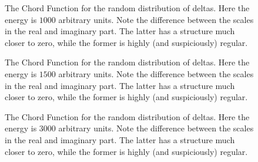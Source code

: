 \documentclass[a4paper,10pt]{article}
\begin{document}
\begin{figure}
\begin{center}
\caption{The Chord Function for the random distribution of deltas. 
Here the energy is $1000$ arbitrary units. Note the difference between
the scales in the real and imaginary part. The latter has a structure much
closer to zero, while the former is highly (and suspiciously) regular.}
\label{XiFunction04}
\end{center}
\end{figure}




\begin{figure}
\begin{center}
\caption{The Chord Function for the random distribution of deltas. 
Here the energy is $1500$ arbitrary units. Note the difference between
the scales in the real and imaginary part. The latter has a structure much
closer to zero, while the former is highly (and suspiciously) regular.}
\label{XiFunction05}
\end{center}
\end{figure}



\begin{figure}
\begin{center}
\caption{The Chord Function for the random distribution of deltas. 
Here the energy is $3000$ arbitrary units. Note the difference between
the scales in the real and imaginary part. The latter has a structure much
closer to zero, while the former is highly (and suspiciously) regular.}
\label{XiFunction06}
\end{center}
\end{figure}
\end{document}
